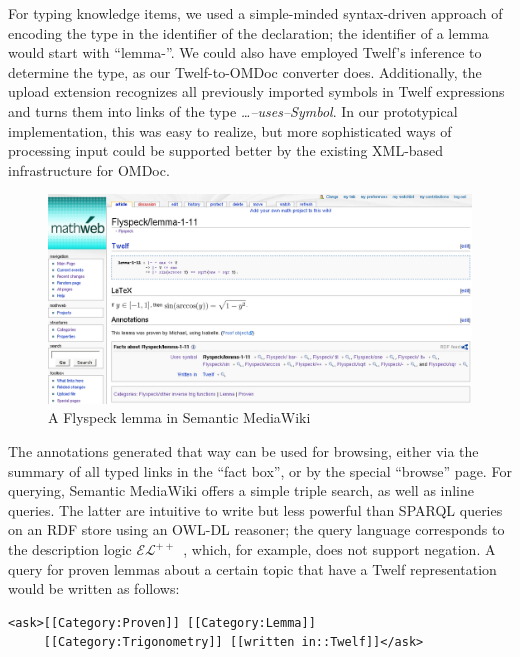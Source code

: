 \documentclass{llncs}
\begin{document}
For typing knowledge items, we used a simple-minded syntax-driven approach of encoding the
type in the identifier of the declaration; the identifier of a lemma would start with
``lemma-''.  We could also have employed Twelf's inference to determine the
type, as our Twelf-to-OMDoc converter does.
Additionally, the upload extension recognizes all previously imported symbols in Twelf
expressions and turns them into links of the type \textit{\ldots--uses--Symbol}.  In our
prototypical implementation, this was easy to realize, but more sophisticated ways of
processing input could be supported better by the existing XML-based infrastructure for
OMDoc.

\begin{figure}
  \centering
  \includegraphics[width=\textwidth]{smw-lemma}
  \caption{A Flyspeck lemma in Semantic MediaWiki}
  \label{fig:smw-lemma}
\end{figure}

The annotations generated that way can be used for browsing, either via the summary of all
typed links in the ``fact box'', or by the special ``browse'' page.  For querying,
Semantic MediaWiki offers a simple triple search, as well as inline queries.  The latter
are intuitive to write but less powerful than SPARQL queries on an RDF store using an
OWL-DL reasoner; the query language corresponds to the description logic
$\mathcal{EL}^{++}$~\cite{KrSchVr:semwiki-reasoning07}, which, for example, does not
support negation.  A query for proven lemmas about a certain topic that have a Twelf
representation would be written as follows:

\begin{lstlisting}
<ask>[[Category:Proven]] [[Category:Lemma]]
     [[Category:Trigonometry]] [[written in::Twelf]]</ask>
\end{lstlisting}
\end{document}
